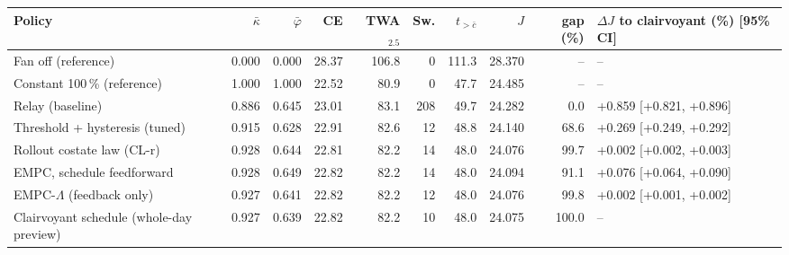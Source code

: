 \begin{tabular}{lrrrrrrrrl}
\toprule
Policy & $\bar\kappa$ & $\bar\varphi$ & CE & TWA$_{2.5}$ & Sw. & $t_{>\bar c}$ & $J$ & gap (\%) & $\Delta J$ to clairvoyant (\%) [95\% CI]\\
\midrule
Fan off (reference) & 0.000 & 0.000 & 28.37 & 106.8 & 0 & 111.3 & 28.370 & -- & --\\
Constant 100\,\% (reference) & 1.000 & 1.000 & 22.52 & 80.9 & 0 & 47.7 & 24.485 & -- & --\\
Relay (baseline) & 0.886 & 0.645 & 23.01 & 83.1 & 208 & 49.7 & 24.282 & 0.0 & +0.859 [+0.821, +0.896]\\
Threshold + hysteresis (tuned) & 0.915 & 0.628 & 22.91 & 82.6 & 12 & 48.8 & 24.140 & 68.6 & +0.269 [+0.249, +0.292]\\
Rollout costate law (CL-r) & 0.928 & 0.644 & 22.81 & 82.2 & 14 & 48.0 & 24.076 & 99.7 & +0.002 [+0.002, +0.003]\\
EMPC, schedule feedforward & 0.928 & 0.649 & 22.82 & 82.2 & 14 & 48.0 & 24.094 & 91.1 & +0.076 [+0.064, +0.090]\\
EMPC-$\Lambda$ (feedback only) & 0.927 & 0.641 & 22.82 & 82.2 & 12 & 48.0 & 24.076 & 99.8 & +0.002 [+0.001, +0.002]\\
Clairvoyant schedule (whole-day preview) & 0.927 & 0.639 & 22.82 & 82.2 & 10 & 48.0 & 24.075 & 100.0 & --\\
\bottomrule
\end{tabular}
